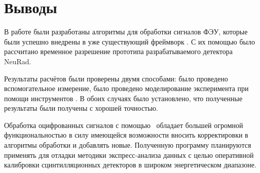 \section{Выводы}


В работе были разработаны алгоритмы для обработки сигналов ФЭУ, которые были успешно внедрены в уже существующий фреймворк \er. С их помощью было рассчитано временное разрешение прототипа разрабатываемого детектора NeuRad. 

Результаты расчётов были проверены двумя способами: было проведено вспомогательное измерение, было проведено моделирование эксперимента при помощи инструментов \er. В обоих случаях было установлено, что полученные результаты были получены с хорошей точностью.

Обработка оцифрованных сигналов с помощью \er\ обладает большей огромной функциональностью в силу имеющейся возможности вносить корректировки в алгоритмы обработки и добавлять новые. Полученную программу планируются применять для отладки методики экспресс-анализа данных с целью оперативной калибровки сцинтилляционных детекторов в широком энергетическом диапазоне.

%
%
%
